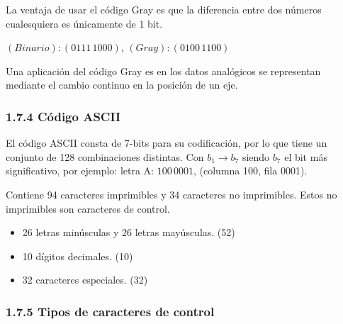 \begin{center}  \end{center} \medskip
\normalsize

La ventaja de usar el c\'{o}digo Gray es que la diferencia entre dos
n\'{u}meros cualesquiera es \'{u}nicamente de 1 bit. \begin{center} $(Binario):
        (0111\,1000)$, $(Gray): (0100\,1100)$ \end{center}

Una aplicaci\'{o}n del c\'{o}digo Gray es en los datos anal\'{o}gicos se
representan mediante el cambio continuo en la posici\'{o}n de un eje.

\subsubsection*{1.7.4 C\'{o}digo ASCII} El c\'{o}digo ASCII consta de 7-bits
para su codificaci\'{o}n, por lo que tiene un conjunto de 128 combinaciones
distintas. Con $b_1 \rightarrow b_7$ siendo $b_7$ el bit m\'{a}s significativo,
por ejemplo: letra A: $100\,0001$, (columna 100, fila 0001).

Contiene 94 caracteres imprimibles y 34 caracteres no imprimibles. Estos no
imprimibles son caracteres de control. \begin{itemize} \item 26 letras
          min\'{u}sculas y 26 letras may\'{u}sculas. (52) \item 10 d\'{i}gitos decimales.
          (10) \item 32 caracteres especiales. (32) \end{itemize} \medbreak

\subsubsection*{1.7.5 Tipos de caracteres de control}

